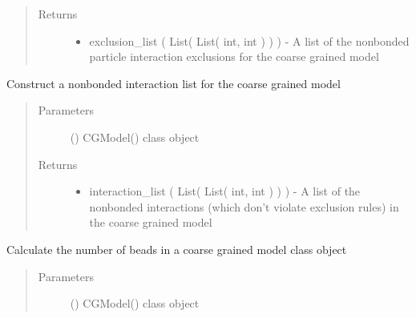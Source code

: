 \documentclass[letterpaper,12pt,english,openany,oneside]{sphinxmanual}
\begin{document}
\begin{fulllineitems}
\begin{fulllineitems}
\begin{quote}
\begin{description}
\item[{Returns}] \leavevmode
\begin{itemize}
\item {} 
exclusion\_list ( List( List( int, int ) ) ) - A list of the nonbonded particle interaction exclusions for the coarse grained model

\end{itemize}


\end{description}\end{quote}

\end{fulllineitems}


\begin{fulllineitems}
\label{\detokenize{cg_model:cg_model.cgmodel.CGModel.get_nonbonded_interaction_list}}
Construct a nonbonded interaction list for the coarse grained model
\begin{quote}\begin{description}
\item[{Parameters}] \leavevmode
{} () \textendash{} CGModel() class object

\item[{Returns}] \leavevmode
\begin{itemize}
\item {} 
interaction\_list ( List( List( int, int ) ) ) - A list of the nonbonded interactions (which don’t violate exclusion rules) in the coarse grained model

\end{itemize}


\end{description}\end{quote}

\end{fulllineitems}


\begin{fulllineitems}
\label{\detokenize{cg_model:cg_model.cgmodel.CGModel.get_num_beads}}
Calculate the number of beads in a coarse grained model class object
\begin{quote}\begin{description}
\item[{Parameters}] \leavevmode
{} () \textendash{} CGModel() class object


\end{description}
\end{quote}
\end{fulllineitems}
\end{fulllineitems}
\end{document}
